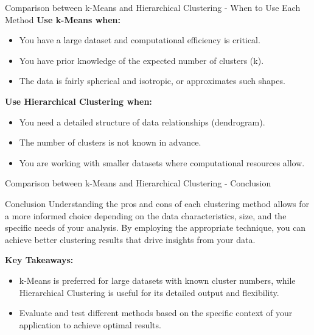 \documentclass[aspectratio=169]{beamer}
\begin{document}
\begin{frame}[fragile]{Comparison between k-Means and Hierarchical Clustering - When to Use Each Method}
    \textbf{Use k-Means when:}
    \begin{itemize}
        \item You have a large dataset and computational efficiency is critical.
        \item You have prior knowledge of the expected number of clusters (k).
        \item The data is fairly spherical and isotropic, or approximates such shapes.
    \end{itemize}

    \textbf{Use Hierarchical Clustering when:}
    \begin{itemize}
        \item You need a detailed structure of data relationships (dendrogram).
        \item The number of clusters is not known in advance.
        \item You are working with smaller datasets where computational resources allow.
    \end{itemize}
\end{frame}

\begin{frame}[fragile]{Comparison between k-Means and Hierarchical Clustering - Conclusion}
    \begin{block}{Conclusion}
        Understanding the pros and cons of each clustering method allows for a more informed choice depending on the data characteristics, size, and the specific needs of your analysis. 
        By employing the appropriate technique, you can achieve better clustering results that drive insights from your data.
    \end{block}

    \textbf{Key Takeaways:}
    \begin{itemize}
        \item k-Means is preferred for large datasets with known cluster numbers, while Hierarchical Clustering is useful for its detailed output and flexibility.
        \item Evaluate and test different methods based on the specific context of your application to achieve optimal results.
    \end{itemize}
\end{frame}
\end{document}
